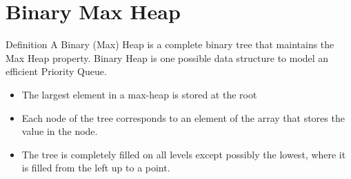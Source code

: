 \documentclass{beamer}
\begin{document}
\section{Binary Max Heap}
\begin{frame}{Definition}
  A Binary (Max) Heap is a complete binary tree that maintains the Max Heap property.
  Binary Heap is one possible data structure to model an efficient Priority Queue. \pause
  \begin{itemize}
    \item The largest element in a max-heap is stored at the root
    \item Each node of the tree corresponds to an element of the array that
stores the value in the node. \pause
    \item The tree is completely filled on all levels except possibly the
lowest, where it is filled from the left up to a point.
  \end{itemize}
\end{frame}
\end{document}
